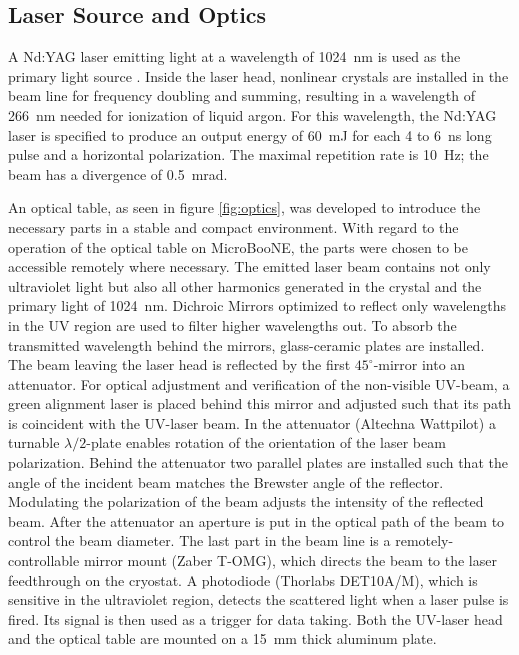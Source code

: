 \subsection{Laser Source and Optics}
A Nd:YAG laser emitting light at a wavelength of 1024~nm is used as the primary light source \cite{continuum}. Inside the laser head, nonlinear crystals are installed in the beam line for frequency doubling and summing, resulting in a wavelength of 266~nm needed for ionization of liquid argon. For this wavelength, the Nd:YAG laser is specified to produce an output energy of 60~mJ for each 4 to 6~ns long pulse and a horizontal polarization. The maximal repetition rate is 10~Hz; the beam has a divergence of 0.5~mrad.

An optical table, as seen in figure \ref{fig:optics}, was developed to introduce the necessary parts in a stable and compact environment. With regard to the operation of the optical table on MicroBooNE, the parts were chosen to be accessible remotely where necessary. The emitted laser beam contains not only ultraviolet light but also all other harmonics generated in the crystal and the primary light of 1024~nm. Dichroic Mirrors optimized to reflect only wavelengths in the UV region are used to filter higher wavelengths out. To absorb the transmitted wavelength behind the mirrors, glass-ceramic plates are installed. The beam leaving the laser head is reflected by the first $45^{\circ}$-mirror into an attenuator. For optical adjustment and verification of the non-visible UV-beam, a green alignment laser is placed behind this mirror and adjusted such that its path is coincident with the UV-laser beam. In the attenuator (Altechna Wattpilot) a turnable $\lambda/2$-plate enables rotation of the orientation of the laser beam polarization. Behind the attenuator two parallel plates are installed such that the angle of the incident beam matches the Brewster angle of the reflector. Modulating the polarization of the beam adjusts the intensity of the reflected beam. After the attenuator an aperture is put in the optical path of the beam to control the beam diameter. The last part in the beam line is a remotely-controllable mirror mount (Zaber T-OMG), which directs the beam to the laser feedthrough on the cryostat. A photodiode (Thorlabs DET10A/M), which is sensitive in the ultraviolet region, detects the scattered light when a laser pulse is fired.  Its signal is then used as a trigger for data taking. Both the UV-laser head and the optical table are mounted on a 15~mm thick aluminum plate.

